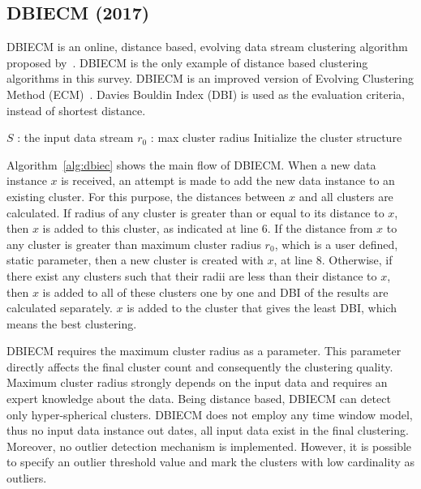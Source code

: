 \documentclass[smallcondensed]{svjour3}     %
\begin{document}
\subsection{DBIECM (2017)}
DBIECM is an online, distance based, evolving data stream clustering algorithm proposed by~\citet{Zhang:2017:dbiecm}. DBIECM is the only example of distance based clustering algorithms in this survey. DBIECM is an improved version of Evolving Clustering Method (ECM)~\citep{Qun:2001:Ecm}. Davies Bouldin Index (DBI) is used as the evaluation criteria, instead of shortest distance.

\begin{algorithm}
	\caption{DBIECM (S, $r_0$)}
	\label{alg:dbiec}
	\begin{algorithmic}[1]
		\Require $S$ : the input data stream
		\Require $r_0$ : max cluster radius
		\State Initialize the cluster structure
		
	\end{algorithmic}
\end{algorithm}

Algorithm~\ref{alg:dbiec} shows the main flow of DBIECM. When a new data instance $x$ is received, an attempt is made to add the new data instance to an existing cluster. For this purpose, the distances between $x$ and all clusters are calculated. If radius of any cluster is greater than or equal to its distance to $x$, then $x$ is added to this cluster, as indicated at line 6. If the distance from $x$ to any cluster is greater than maximum cluster radius $r_0$, which is a user defined, static parameter, then a new cluster is created with $x$, at line 8. Otherwise, if there exist any clusters such that their radii are less than their distance to $x$, then $x$ is added to all of these clusters one by one and DBI of the results are calculated separately. $x$ is added to the cluster that gives the least DBI, which means the best clustering.

DBIECM requires the maximum cluster radius as a parameter. This parameter directly affects the final cluster count and consequently the clustering quality. Maximum cluster radius strongly depends on the input data and requires an expert knowledge about the data. Being distance based, DBIECM can detect only hyper-spherical clusters. DBIECM does not employ any time window model, thus no input data instance out dates, all input data exist in the final clustering. Moreover, no outlier detection mechanism is implemented. However, it is possible to specify an outlier threshold value and mark the clusters with low cardinality as outliers. 
\end{document}
